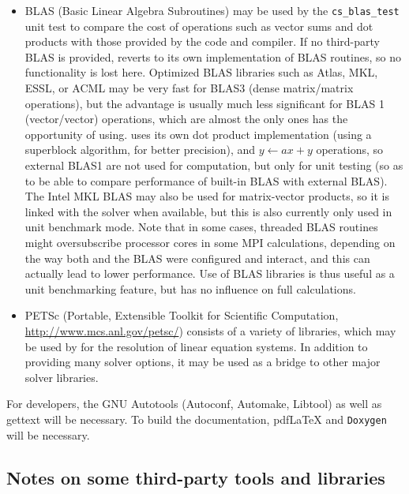 \documentclass[a4paper,10pt,twoside]{csshortdoc}
\begin{document}
\begin{itemize}
\item BLAS (Basic Linear Algebra Subroutines) may be used by the
      \texttt{cs\_blas\_test} unit test to compare the cost of operations
      such as vector sums and dot products with those provided
      by the code and compiler.
      If no third-party BLAS is provided, \CS reverts to its own
      implementation of BLAS routines, so no functionality is lost here.
      Optimized BLAS libraries such as Atlas, MKL, ESSL, or ACML may be very
      fast for BLAS3 (dense matrix/matrix operations), but the advantage is
      usually much less significant for BLAS 1 (vector/vector) operations, which
      are almost the only ones \CS has the opportunity of using.
      \CS uses its own dot product implementation (using a superblock algorithm,
      for better precision), and $y \leftarrow ax+y$ operations, so external
      BLAS1 are not used for computation, but only for unit testing (so as
      to be able to compare performance of built-in BLAS with external BLAS).
      The Intel MKL BLAS may also be used for matrix-vector products, so it
      is linked with the solver when available, but this is also currently only
      used in unit benchmark mode.
      Note that in some cases, threaded BLAS routines might oversubscribe
      processor cores in some MPI calculations, depending on the way both
      \CS and the BLAS were configured and interact, and this can actually
      lead to lower performance.
      Use of BLAS libraries is thus useful as a unit benchmarking feature,
      but has no influence on full calculations.

\item PETSc (Portable, Extensible Toolkit for Scientific Computation,
      \url{http://www.mcs.anl.gov/petsc/}) consists  of a variety of libraries,
      which may be used by \CS for the resolution of linear equation systems.
      In addition to providing many solver options, it may be used as a bridge
      to other major solver libraries.

\end{itemize}

For developers, the GNU Autotools (Autoconf, Automake, Libtool) as
well as gettext will be necessary. To build the documentation,
pdf\LaTeX{} and \texttt{Doxygen} will be necessary.

\subsection{Notes on some third-party tools and libraries}
\end{document}
